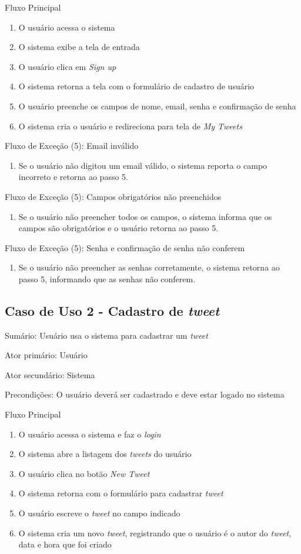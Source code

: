Fluxo Principal\begin{enumerate}
\item O usuário acessa o sistema
\item O sistema exibe a tela de entrada
\item O usuário clica em \textit{Sign up}
\item O sistema retorna a tela com o formulário de cadastro de usuário
\item O usuário preenche os campos de nome, email, senha e confirmação de senha
\item O sistema cria o usuário e redireciona para tela de \textit{My Tweets}
\end{enumerate}

Fluxo de Exceção (5): Email inválido
\begin{enumerate}
\item Se o usuário não digitou um email válido, o sistema reporta o campo incorreto e retorna ao passo 5.
\end{enumerate}

Fluxo de Exceção (5): Campos obrigatórios não preenchidos
\begin{enumerate}
\item Se o usuário não preencher todos os campos, o sistema informa que os campos são obrigatórios e o usuário retorna ao passo 5.
\end{enumerate}

Fluxo de Exceção (5): Senha e confirmação de senha não conferem
\begin{enumerate}
\item Se o usuário não preencher as senhas corretamente, o sistema retorna ao passo 5, informando que as senhas não conferem.
\end{enumerate}

\subsection{Caso de Uso 2 - Cadastro de \textit{tweet}}
\label{subsec:useCaseCreateTweet}

Sumário: Usuário usa o sistema para cadastrar um \textit{tweet}

Ator primário: Usuário

Ator secundário: Sistema

Precondições: O usuário deverá ser cadastrado e deve estar logado no sistema

Fluxo Principal
\begin{enumerate}
\item O usuário acessa o sistema e faz o \textit{login}
\item O sistema abre a listagem dos \textit{tweets} do usuário
\item O usuário clica no botão \textit{New Tweet}
\item O sistema retorna com o formulário para cadastrar \textit{tweet}
\item O usuário escreve o \textit{tweet} no campo indicado
\item O sistema cria um novo \textit{tweet}, registrando que o usuário é o autor do \textit{tweet}, data e hora que foi criado
\end{enumerate}


